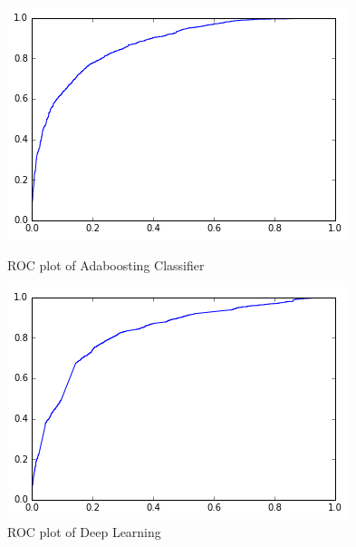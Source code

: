 \documentclass[11pt]{article}
\begin{document}
\begin{figure}[!ht]
\centering
\begin{minipage}{.5\textwidth}
  \centering
  \includegraphics[width=.8\linewidth]{adaboost_rocplot.png}
  \caption{ROC plot of Adaboosting Classifier}
\end{minipage}%
\begin{minipage}{.5\textwidth}
  \centering
  \includegraphics[width=.8\linewidth]{dp_rocplot.png}
  \caption{\small{ROC plot of Deep Learning}}
\end{minipage}%
\end{figure}





\end{document}
